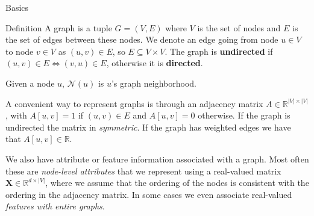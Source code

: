 \documentclass[10pt, aspectratio=169, compress, protectframetitle, handout]{beamer}
\begin{document}
\begin{frame}{Basics}
    
    \begin{block}{Definition}
        A \alert{graph} is a tuple $G = (V, E)$ where $V$ is the set of nodes and $E$ is the set of edges between these nodes. We denote an edge going from node $u \in V$ to node $v \in V$ as $(u, v) \in E$, so $E \subseteq V \times V$. The graph is \textbf{undirected} if $(u, v) \in E \Longleftrightarrow  (v, u) \in E$, otherwise it is \textbf{directed}.
    \end{block}
    
    Given a node $u$, $\mathcal N(u)$ is $u$'s graph neighborhood.
    
    A convenient way to represent graphs is through an \alert{adjacency matrix} $A \in \mathbb R^{|V| \times |V|}$, with $A[u, v] = 1$ if $(u, v) \in E$ and $A[u, v] = 0$ otherwise. If the graph is undirected the matrix in \emph{symmetric}. If the graph has weighted edges we have that $A[u,v] \in \mathbb R$.
    
    We also have \alert{attribute} or \alert{feature} information associated with a graph. Most often these are \emph{node-level attributes} that we represent using a real-valued matrix $\mathbf X \in \mathbb R^{d \times |V|}$, where we assume that the ordering of the nodes is consistent with the ordering in the adjacency matrix. In some cases we even associate real-valued \emph{features with entire graphs}.
    
\end{frame}
\end{document}
